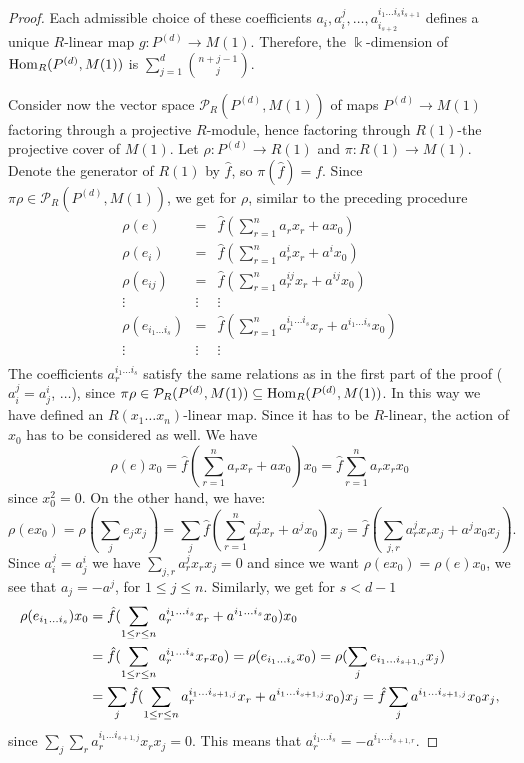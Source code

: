 \documentclass[10pt]{amsart}
\begin{document}
\begin{proof}
\noindent Each admissible choice of these coefficients  $a_i,a_i^j,\ldots  ,a_{i_{s+2}}^{i_1\ldots i_si_{s+1}}$
defines a unique  $R$-linear map $g\colon P^{(d)}\to M(1)$.
Therefore, the $\Bbbk$-dimension of $\operatorname{Hom}_R(P^{(d)},M(1))$ is $\sum_{j=1}^{d}\binom{n+j-1}{j}$. 

\smallskip
\noindent  Consider now the vector space $\mathcal P_R(P^{(d)},M(1))$ of maps $P^{(d)}\to M(1)$ factoring through
a projective $R$-module, hence factoring through $R(1)$-the projective cover of $M(1)$. 
Let $\rho\colon P^{(d)}\to R(1)$ and $\pi\colon R(1)\to M(1)$. Denote the generator of $R(1)$ by $\hat f$, so $\pi (\hat f) =f$. Since $\pi\rho\in\mathcal P_R(P^{(d)},M(1))$, we get for $\rho$, similar to the preceding procedure
$$\begin{array}{ccc}
\rho(e)                      & =       &  \hat f(\sum_{r=1}^n a_rx_r  + ax_0)\\
\rho(e_i)                   & =       &    \hat f(\sum_{r=1}^n a^i_rx_r + a^ix_0) \\
\rho(e_{ij})                 & =       &    \hat f(\sum_{r=1}^n a^{ij}_rx_r  + a^{ij}x_0)\\
\vdots     &\vdots              &\vdots                                  \\
\rho(e_{i_1\ldots i_s}) & =       &    \hat f(\sum_{r=1}^n a^{i_1\ldots i_s}_rx_r + a^{i_1\ldots i_s}x_0) \\
\vdots     &\vdots              &\vdots       \\
\end{array}$$
The coefficients $a^{i_1\ldots i_s}_r$  satisfy the same relations as in the first part of the proof
 ($a_i^j = a_j^i$, $\ldots$),
since $\pi\rho\in\mathcal P_R(P^{(d)},M(1))\subseteq\operatorname{Hom}_R(P^{(d)},M(1))$. In this way we have defined an $R(x_1\ldots x_n)$-linear
map. Since it has to be $R$-linear, the action of $x_0$ has to be considered as well.
We have $$\rho(e)x_0=\hat f(\sum_{r=1}^n a_rx_r  + ax_0)x_0  = \hat f\sum_{r=1}^n a_rx_r x_0$$
since $x_0^2=0$. On the other hand, we have:
$$\rho (ex_0)=\rho(\sum_j e_jx_j)= \sum_j\hat f(\sum_{r=1}^na^j_rx_r + a^jx_0)x_j=\hat f(\sum_{j,r}a^j_rx_rx_j+a^jx_0x_j).$$ 
Since $a_i^j = a_j^i$ we have $\sum_{j,r}a^j_rx_rx_j =0$
and since we want $\rho(ex_0)=\rho(e)x_0$, we see that $a_j = -a^j$, for $1\leq j \leq n$.  Similarly, we get for $s<d-1$
\begin{align*}
\rho(e_{i_1\ldots i_s})x_0\notag&=\hat f(\sum_{1\le r\le n}a^{i_1\ldots i_s}_rx_r + a^{i_1\ldots i_s}x_0)x_0\notag\\&=
\hat f(\sum_{1\le r\le n}a^{i_1\ldots i_s}_rx_r x_0)=\rho(e_{i_1\ldots i_s}x_0)=\rho( \sum_j e_{i_1\ldots i_{s+1,j}}x_j)\notag\\& =  
\sum_j\hat f(\sum_{1\le r\le n}a^{i_1\ldots i_{s+1,j}}_rx_r + a^{i_1\ldots i_{s+1,j}}x_0)x_j=\hat f\sum_j a^{i_1\ldots i_{s+1,j}}x_0x_j\notag,
\end{align*}
since $\sum_j\sum_{r}a^{i_1\ldots i_{s+1,j}}_rx_r x_j =0$. This means that $a^{i_1\ldots i_s}_r= -a^{i_1\ldots i_{s+1,r}}$. 


\end{proof}
\end{document}
